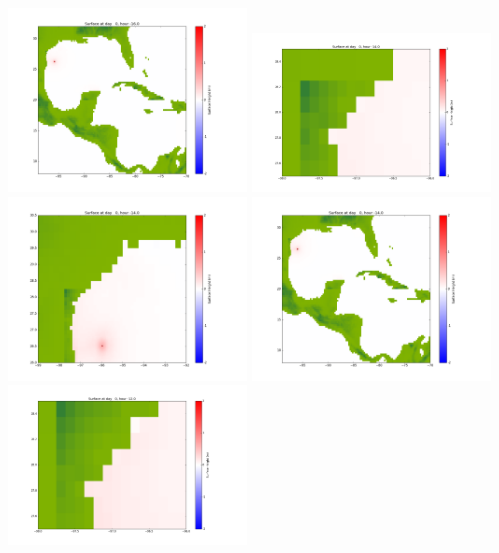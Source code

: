 \documentclass[11pt]{article}
\begin{document}
\vskip 10pt 
\includegraphics[width=0.475\textwidth]{frame0016fig1003.png}
\vskip 10pt 
\includegraphics[width=0.475\textwidth]{frame0017fig1001.png}
\includegraphics[width=0.475\textwidth]{frame0017fig1002.png}
\vskip 10pt 
\includegraphics[width=0.475\textwidth]{frame0017fig1003.png}
\vskip 10pt 
\includegraphics[width=0.475\textwidth]{frame0018fig1001.png}
\end{document}
